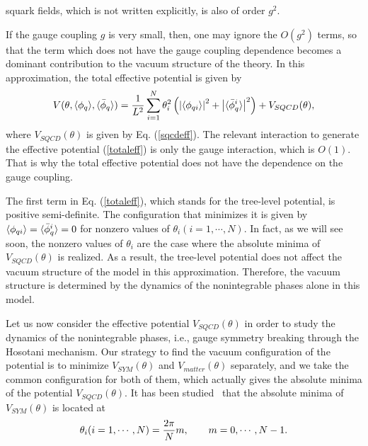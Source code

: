 \documentclass[a4paper,12pt]{article}
\begin{document}
squark fields, which is not written explicitly, is also of order $g^2$.
\par
If the gauge coupling $g$ is very small, then, one may ignore the 
$O(g^2)$ terms, so that the term which does not have the gauge coupling 
dependence becomes a dominant contribution to the vacuum structure 
of the theory.
In this approximation, the total effective potential is given by
\begin{equation}
V(\theta, \langle \phi_q \rangle, \langle {\bar\phi}_q \rangle)=
{1\over L^2}
\sum_{i=1}^{N}\theta_i^2\left({\left|{\langle \phi_{qi} \rangle}\right|}^2
+{\left|{\langle {\bar\phi}^{i}_q \rangle}\right|}^2\right)+V_{SQCD}(\theta),
\label{totaleff}
\end{equation}
where $V_{SQCD}(\theta)$ is given by Eq. (\ref{sqcdeff}). 
The relevant interaction to generate the 
effective potential (\ref{totaleff}) is only the
gauge interaction, which is $O(1)$. That is why the total effective
potential does not have the dependence on the gauge coupling.
\par
The first term in Eq. (\ref{totaleff}), which stands for the 
tree-level potential, is positive semi-definite.
The configuration that minimizes it
is given by $\langle \phi_{qi} \rangle=\langle {\bar\phi}_q^i \rangle=0$ for nonzero values 
of $\theta_i (i=1,\cdots, N)$. In fact, as we will see soon, the 
nonzero values of $\theta_i$ are the case where  
the absolute minima of $V_{SQCD}(\theta)$ is realized.
As a result, the tree-level potential 
does not affect the vacuum structure
of the model in this approximation. Therefore, the vacuum structure is 
determined by the dynamics of the nonintegrable phases alone in this model.
\par
Let us now consider the effective potential $V_{SQCD}(\theta)$ in 
order to study the dynamics of the nonintegrable phases, i.e., gauge
symmetry breaking through the Hosotani mechanism. 
Our strategy to find the vacuum configuration of
the potential is to minimize $V_{SYM}(\theta)$ 
and $V_{matter}(\theta)$ separately, and we take 
the common configuration for both of them, which actually gives the 
absolute minima of the potential $V_{SQCD}(\theta)$. It has been
studied~\cite{takenagab} that the absolute minima
of $V_{SYM}(\theta)$ is located at
\begin{equation}
\theta_i(i=1,\cdots, N)={{2\pi}\over{N}}m, \qquad m=0, \cdots, N-1.
\label{symsol}
\end{equation}
\end{document}
